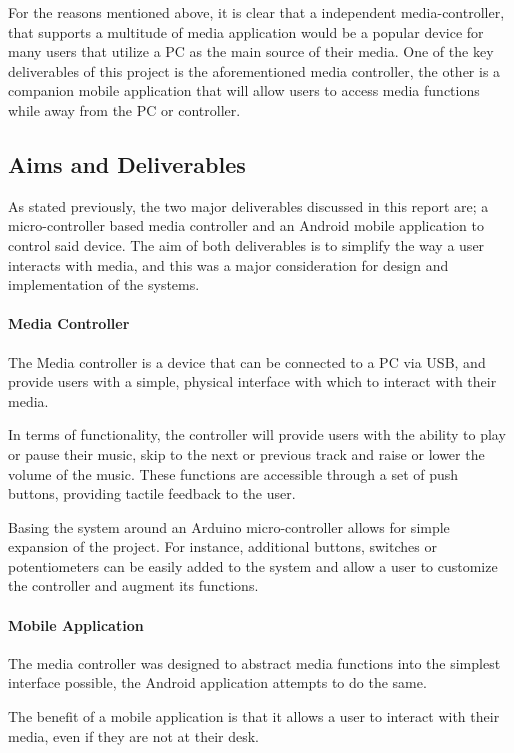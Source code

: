 \documentclass{article}
\begin{document}
			For the reasons mentioned above, it is clear that a independent media-controller, that supports a multitude of media application would be a popular device for many users that utilize a PC as the main source of their media. One of the key deliverables of this project is the aforementioned media controller, the other is a companion mobile application that will allow users to access media functions while away from the PC or controller.
					
		\subsection{Aims and Deliverables}
			As stated previously, the two major deliverables discussed in this report are; a micro-controller based media controller and an Android mobile application to control said device. The aim of both deliverables is to simplify the way a user interacts with media, and this was a major consideration for design and implementation of the systems.
			
			\paragraph{Media Controller}
				The Media controller is a device that can be connected to a PC via USB, and provide users with a simple,  physical interface with which to interact with their media. 
				
				In terms of functionality, the controller will provide users with the ability to play or pause their music, skip to the next or previous track and raise or lower the volume of the music. These functions are accessible through a set of push buttons, providing tactile feedback to the user.
				
				Basing the system around an Arduino micro-controller \cite{Arduino:online} allows for simple expansion of the project. For instance, additional buttons, switches or potentiometers can be easily added to the system and allow a user to customize the controller and augment its functions.
			
			\paragraph{Mobile Application}
				The media controller was designed to abstract media functions into the simplest interface possible, the Android application attempts to do the same.
				
				The benefit of a mobile application is that it allows a user to interact with their media, even if they are not at their desk. 
				
\end{document}
